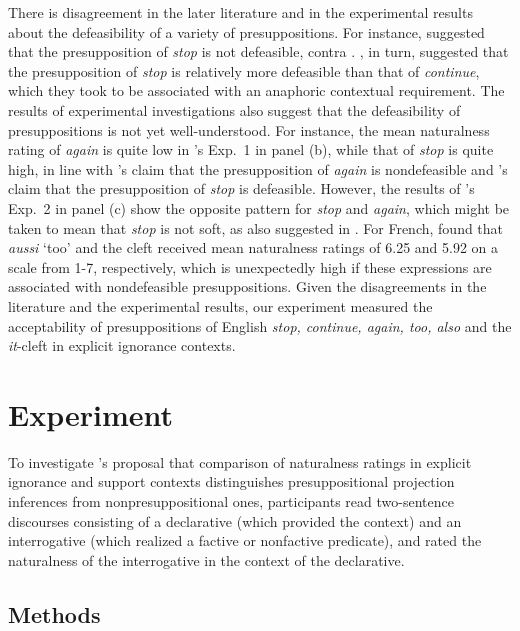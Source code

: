 \documentclass[11pt,fleqn]{article}
\newcommand{\6}{\mbox{$[\hspace*{-.6mm}[$}}
\newcommand{\9}{\mbox{$]\hspace*{-.6mm}]$}}
\newcommand{\citepos}[1]{\citeauthor{#1}'s \citeyear{#1}}
\begin{document}
There is disagreement in the later literature and in the experimental results about the defeasibility of a variety of presuppositions. For instance, \citealt[193]{abrusan2016} suggested that the presupposition of \emph{stop} is not defeasible, contra \citealt{simons01}. \citealt[734ff.]{roberts-simons2024}, in turn, suggested that the presupposition of \emph{stop} is relatively more defeasible than that of \emph{continue}, which they took to be associated with an anaphoric contextual requirement. The results of experimental investigations also suggest that the defeasibility of presuppositions is not yet well-understood. For instance, the mean naturalness rating of \emph{again} is quite low in \citepos{kalomoiros-schwarz2024} Exp.~1 in panel (b), while that of \emph{stop} is quite high, in line with \citepos{abusch10} claim that the presupposition of \emph{again} is nondefeasible and \citepos{simons01} claim that the presupposition of \emph{stop} is defeasible. However, the results of \citepos{kalomoiros-schwarz2024} Exp.~2 in panel (c) show the opposite pattern for \emph{stop} and \emph{again}, which might be taken to mean that \emph{stop} is not soft, as also suggested in \citealt[193]{abrusan2016}. For French, \citealt{jayez-etal2015} found that \emph{aussi} `too' and the cleft received mean naturalness ratings of 6.25 and 5.92 on a scale from 1-7, respectively, which is unexpectedly high if these expressions are associated with nondefeasible presuppositions. Given the disagreements in the literature and the experimental results, our experiment measured the acceptability of presuppositions of English \emph{stop, continue, again, too, also} and the {\em it}-cleft in explicit ignorance contexts.

\section{Experiment}\label{s2}

To investigate \citepos{mandelkern-etal2020} proposal that comparison of naturalness ratings in explicit ignorance and support contexts distinguishes presuppositional projection inferences from nonpresuppositional ones, participants read two-sentence discourses consisting of a declarative (which provided the context) and an interrogative (which realized a factive or nonfactive predicate), and rated the naturalness of the interrogative in the context of the declarative.

\subsection{Methods}\label{s-methods}
\end{document}
